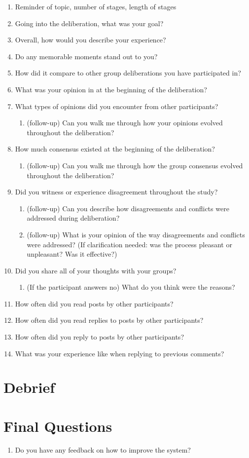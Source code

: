 \begin{enumerate}
\item Reminder of topic, number of stages, length of stages
\item Going into the deliberation, what was your goal?
\item Overall, how would you describe your experience?
\item Do any memorable moments stand out to you?
\item How did it compare to other group deliberations you have participated in? 
\item What was your opinion in at the beginning of the deliberation?
\item What types of opinions did you encounter from other participants?
\begin{enumerate}
\item (follow-up) Can you walk me through how your opinions evolved throughout the deliberation?
\end{enumerate}
\item How much consensus existed at the beginning of the deliberation?
\begin{enumerate}
\item (follow-up) Can you walk me through how the group consensus evolved throughout the deliberation? 
\end{enumerate}
\item Did you witness or experience disagreement throughout the study?
\begin{enumerate}
\item (follow-up) Can you describe how disagreements and conflicts were addressed during deliberation? 
\item (follow-up) What is your opinion of the way disagreements and conflicts were addressed? (If clarification needed: was the process pleasant or unpleasant? Was it effective?)
\end{enumerate}
\item Did you share all of your thoughts with your groups?
\begin{enumerate}
\item (If the participant answers no) What do you think were the reasons?
\end{enumerate}
\item How often did you read posts by other participants? 
\item How often did you read replies to posts by other participants?
\item How often did you reply to posts by other participants?
\item What was your experience like when replying to previous comments?
\end{enumerate}

\section{Debrief}

\section{Final Questions}

\begin{enumerate}
\item Do you have any feedback on how to improve the system?
\end{enumerate}